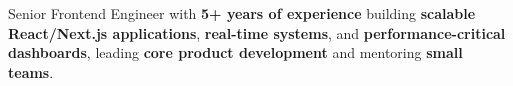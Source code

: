 
\begin{cvparagraph}

Senior Frontend Engineer with \textbf{5+ years of experience} building \textbf{scalable React/Next.js applications}, \textbf{real-time systems}, and \textbf{performance-critical dashboards}, leading \textbf{core product development} and mentoring \textbf{small teams}.
\end{cvparagraph}
